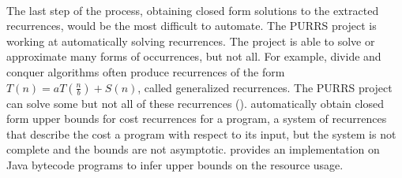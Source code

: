\paragraph{}
The last step of the process, obtaining closed form solutions to the extracted
recurrences, would be the most difficult to automate. The PURRS project is
working at automatically solving recurrences. The project
is able to solve or approximate many forms of occurrences, but not all. For
example, divide and conquer algorithms often produce recurrences of the form
$T(n) = a T(\frac{n}{b}) + S(n)$, called generalized recurrences. The PURRS
project can solve some but not all of these recurrences (\citet{Bagnara2003}).
\citet{Albert2011} automatically obtain closed form upper bounds for cost
recurrences for a program, a system of recurrences that describe the cost a
program with respect to its input, but the system is not complete and the
bounds are not asymptotic. \citet{Albert2013} provides an implementation on
Java bytecode programs to infer upper bounds on the resource usage.

